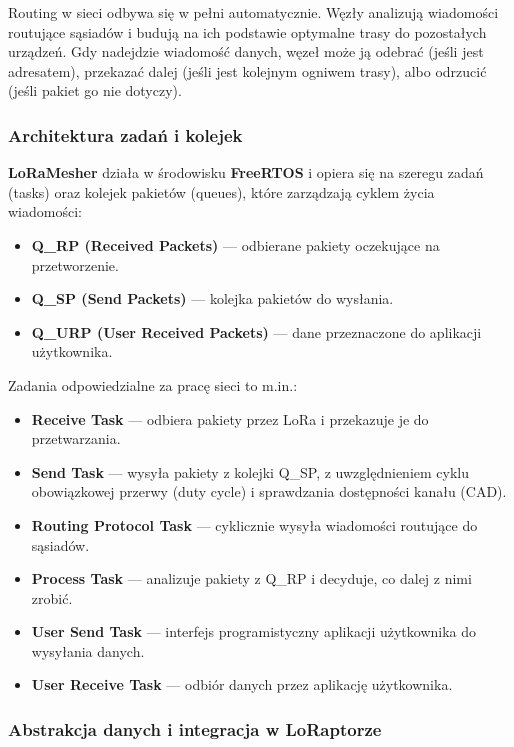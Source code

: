 Routing w sieci odbywa się w pełni automatycznie. Węzły analizują wiadomości routujące sąsiadów i budują na ich podstawie optymalne trasy do pozostałych urządzeń. Gdy nadejdzie wiadomość danych, węzeł może ją odebrać (jeśli jest adresatem), przekazać dalej (jeśli jest kolejnym ogniwem trasy), albo odrzucić (jeśli pakiet go nie dotyczy).

\clearpage
\subsubsection{Architektura zadań i kolejek}

\textbf{LoRaMesher} działa w środowisku \textbf{FreeRTOS} i opiera się na szeregu zadań (tasks) oraz kolejek pakietów (queues), które zarządzają cyklem życia wiadomości:

\begin{itemize}
	\item \textbf{Q\_RP (Received Packets)} — odbierane pakiety oczekujące na przetworzenie.
	\item \textbf{Q\_SP (Send Packets)} — kolejka pakietów do wysłania.
	\item \textbf{Q\_URP (User Received Packets)} — dane przeznaczone do aplikacji użytkownika.
\end{itemize}
Zadania odpowiedzialne za pracę sieci to m.in.:
\begin{itemize}
	\item \textbf{Receive Task} — odbiera pakiety przez LoRa i przekazuje je do przetwarzania.
	\item \textbf{Send Task} — wysyła pakiety z kolejki Q\_SP, z uwzględnieniem cyklu obowiązkowej przerwy (duty cycle) i sprawdzania dostępności kanału (CAD).
	\item \textbf{Routing Protocol Task} — cyklicznie wysyła wiadomości routujące do sąsiadów.
	\item \textbf{Process Task} — analizuje pakiety z Q\_RP i decyduje, co dalej z nimi zrobić.
	\item \textbf{User Send Task} — interfejs programistyczny aplikacji użytkownika do wysyłania danych.
	\item \textbf{User Receive Task} — odbiór danych przez aplikację użytkownika.
\end{itemize}

\clearpage
\subsubsection{Abstrakcja danych i integracja w LoRaptorze}

